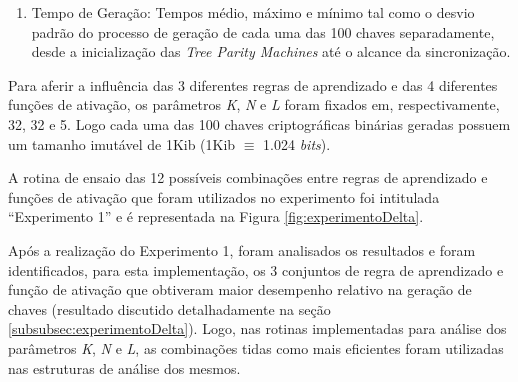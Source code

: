 \documentclass[12pt]{article}
\newcommand{\bits}{\textit{bits}\xspace}
\begin{document}
\begin{enumerate}
                \item Tempo de Geração:
                    Tempos médio, máximo e mínimo tal como o desvio padrão do processo de geração de cada uma das 100 chaves separadamente, desde a inicialização das \textit{Tree Parity Machines} até o alcance da sincronização.
                    
                    

            \end{enumerate}

            Para aferir a influência das 3 diferentes regras de aprendizado e das 4 diferentes funções de ativação, os parâmetros \textit{K}, \textit{N} e \textit{L} foram fixados em, respectivamente, 32, 32 e 5. Logo cada uma das 100 chaves criptográficas binárias geradas possuem um tamanho imutável de 1Kib (1Kib $\equiv$ 1.024 \bits).
            
            A rotina de ensaio das 12 possíveis combinações entre regras de aprendizado e funções de ativação que foram utilizados no experimento foi intitulada ``Experimento 1'' e é representada na Figura \ref{fig:experimentoDelta}.

            

            Após a realização do Experimento 1, foram analisados os resultados e foram identificados, para esta implementação, os 3 conjuntos de regra de aprendizado e função de ativação que obtiveram maior desempenho relativo na geração de chaves (resultado discutido detalhadamente na seção \ref{subsubsec:experimentoDelta}). Logo, nas rotinas implementadas para análise dos parâmetros \textit{K}, \textit{N} e \textit{L}, as combinações tidas como mais eficientes foram utilizadas nas estruturas de análise dos mesmos.
\end{document}
